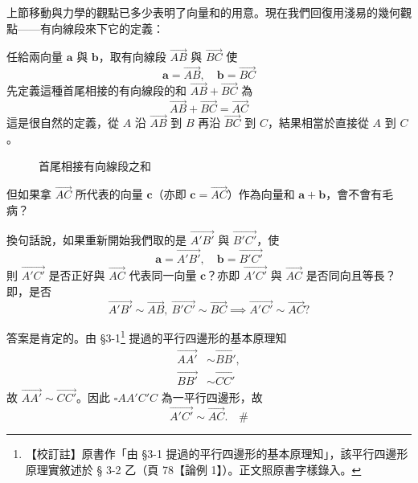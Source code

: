 上節移動與力學的觀點已多少表明了向量和的用意。現在我們回復用淺易的幾何觀點——有向線段來下它的定義：

任給兩向量 $\mathbf{a}$ 與 $\mathbf{b}$，取有向線段 $\vec{AB}$ 與 $\vec{BC}$ 使
\[ \mathbf{a} = \vec{AB}, \quad \mathbf{b} = \vec{BC} \]
先定義這種首尾相接的有向線段的和 $\vec{AB} + \vec{BC}$ 為
\[ \vec{AB} + \vec{BC} = \vec{AC} \]
這是很自然的定義，從 $A$ 沿 $\vec{AB}$ 到 $B$ 再沿 $\vec{BC}$ 到 $C$，結果相當於直接從 $A$ 到 $C$。

\begin{figure}[H]
\centering
{}
\caption{首尾相接有向線段之和}
\label{fig:b3s-fig3-13}
\end{figure}

但如果拿 $\vec{AC}$ 所代表的向量 $\mathbf{c}$（亦即 $\mathbf{c} = \vec{AC}$）作為向量和 $\mathbf{a} + \mathbf{b}$，會不會有毛病？

換句話說，如果重新開始我們取的是 $\vec{A'B'}$ 與 $\vec{B'C'}$，使
\[ \mathbf{a} = \vec{A'B'}, \quad \mathbf{b} = \vec{B'C'} \]
則 $\vec{A'C'}$ 是否正好與 $\vec{AC}$ 代表同一向量 $\mathbf{c}$？亦即 $\vec{A'C'}$ 與 $\vec{AC}$ 是否同向且等長？即，是否
\[ \vec{A'B'} \sim \vec{AB}, \ \vec{B'C'} \sim \vec{BC} \implies \vec{A'C'} \sim \vec{AC}? \]

\label{note:b3s-ch3-p83-sec-ref}%
答案是肯定的。由 §3-1\footnote{【校訂註】原書作「由 §3-1 提過的平行四邊形的基本原理知」，該平行四邊形原理實敘述於 § 3-2 乙（頁 78【論例 1】）。正文照原書字樣錄入。} 提過的平行四邊形的基本原理知
\begin{align*}
\vec{AA'} &\sim \vec{BB'}, \\
\vec{BB'} &\sim \vec{CC'}
\end{align*}
故 $\vec{AA'} \sim \vec{CC'}$。因此 $\square AA'C'C$ 為一平行四邊形，故
\[ \vec{A'C'} \sim \vec{AC}. \quad \# \]

